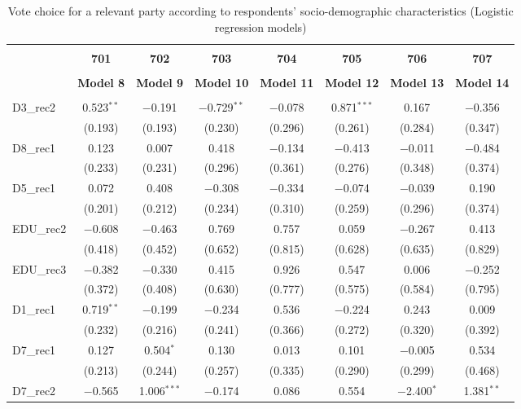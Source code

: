\documentclass[
]{article}
\begin{document}
\begin{table}[!htbp] \centering 
  \caption{Vote choice for a relevant party according to respondents' 
                       socio-demographic characteristics (Logistic regression models)} 
  \label{table:full_logit_dk} 
\begin{tabular}{@{\extracolsep{5pt}}lccccccc} 
\\[-1.8ex]\hline \\[-1.8ex] 
 & \textbf{701} & \textbf{702} & \textbf{703} & \textbf{704} & \textbf{705} & \textbf{706} & \textbf{707} \\ 
\\[-1.8ex] & \textbf{Model 8} & \textbf{Model 9} & \textbf{Model 10} & \textbf{Model 11} & \textbf{Model 12} & \textbf{Model 13} & \textbf{Model 14}\\ 
\hline \\[-1.8ex] 
 D3\_rec2 & 0.523$^{**}$ & $-$0.191 & $-$0.729$^{**}$ & $-$0.078 & 0.871$^{***}$ & 0.167 & $-$0.356 \\ 
  & (0.193) & (0.193) & (0.230) & (0.296) & (0.261) & (0.284) & (0.347) \\ 
  D8\_rec1 & 0.123 & 0.007 & 0.418 & $-$0.134 & $-$0.413 & $-$0.011 & $-$0.484 \\ 
  & (0.233) & (0.231) & (0.296) & (0.361) & (0.276) & (0.348) & (0.374) \\ 
  D5\_rec1 & 0.072 & 0.408 & $-$0.308 & $-$0.334 & $-$0.074 & $-$0.039 & 0.190 \\ 
  & (0.201) & (0.212) & (0.234) & (0.310) & (0.259) & (0.296) & (0.374) \\ 
  EDU\_rec2 & $-$0.608 & $-$0.463 & 0.769 & 0.757 & 0.059 & $-$0.267 & 0.413 \\ 
  & (0.418) & (0.452) & (0.652) & (0.815) & (0.628) & (0.635) & (0.829) \\ 
  EDU\_rec3 & $-$0.382 & $-$0.330 & 0.415 & 0.926 & 0.547 & 0.006 & $-$0.252 \\ 
  & (0.372) & (0.408) & (0.630) & (0.777) & (0.575) & (0.584) & (0.795) \\ 
  D1\_rec1 & 0.719$^{**}$ & $-$0.199 & $-$0.234 & 0.536 & $-$0.224 & 0.243 & 0.009 \\ 
  & (0.232) & (0.216) & (0.241) & (0.366) & (0.272) & (0.320) & (0.392) \\ 
  D7\_rec1 & 0.127 & 0.504$^{*}$ & 0.130 & 0.013 & 0.101 & $-$0.005 & 0.534 \\ 
  & (0.213) & (0.244) & (0.257) & (0.335) & (0.290) & (0.299) & (0.468) \\ 
  D7\_rec2 & $-$0.565 & 1.006$^{***}$ & $-$0.174 & 0.086 & 0.554 & $-$2.400$^{*}$ & 1.381$^{**}$ \\ 

\end{tabular}
\end{table}
\end{document}
